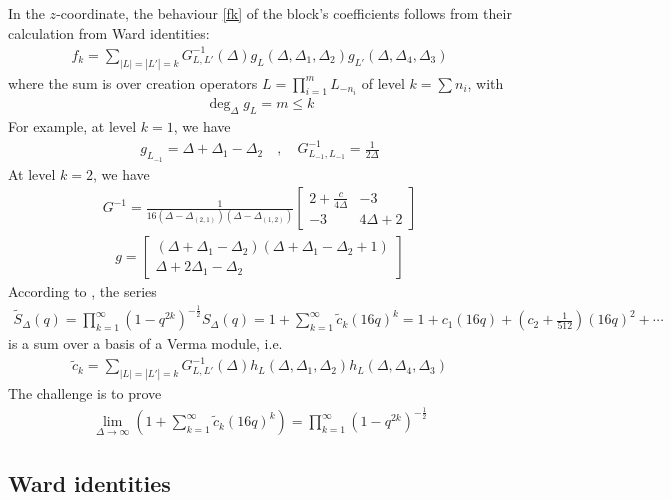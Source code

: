 \documentclass[12pt,a4paper]{article}
\begin{document}
In the $z$-coordinate, the behaviour \eqref{fk} of the block's coefficients follows from their calculation from Ward identities:
\begin{align}
 f_k = \sum_{|L|=|L'|=k} G^{-1}_{L,L'}(\Delta) g_L(\Delta,\Delta_1,\Delta_2)g_{L'}(\Delta,\Delta_4,\Delta_3)
\label{fke}
 \end{align}
where the sum is over creation operators $L=\prod_{i=1}^m L_{-n_i}$ of level $k=\sum n_i$, with 
\begin{align}
 \deg_\Delta g_L = m\leq k
\end{align}
For example, at level $k=1$, we have 
\begin{align}
 g_{L_{-1}} = \Delta + \Delta_1-\Delta_2 \quad , \quad G^{-1}_{L_{-1},L_{-1}} = \frac{1}{2\Delta} 
\end{align}
At level $k=2$, we have 
\begin{align}
G^{-1} = \frac{1}{16(\Delta-\Delta_{(2,1)})(\Delta-\Delta_{(1,2)})} \begin{bmatrix} 2+\frac{c}{4\Delta} & -3 \\ -3 & 4\Delta+2 \end{bmatrix}
\end{align}
\begin{align}
 g = \begin{bmatrix} (\Delta+\Delta_1-\Delta_2)(\Delta+\Delta_1-\Delta_2+1) \\ \Delta+2\Delta_1-\Delta_2 \end{bmatrix}
\end{align}
According to \cite[Eq. (7.11)]{msz15}, the series 
\begin{align}
 \widetilde{S}_\Delta(q) =  \prod_{k=1}^\infty\left(1-q^{2k}\right)^{-\frac12} S_\Delta(q)  = 1+\sum_{k=1}^\infty \tilde{c}_k (16q)^k = 1 + c_1 (16q) + \left(c_2+\tfrac{1}{512}\right) (16q)^2 + \cdots 
\end{align}
is a sum over a basis of a Verma module, i.e. 
\begin{align}
 \tilde{c}_k = \sum_{|L|=|L'|=k} G^{-1}_{L,L'}(\Delta) h_L(\Delta,\Delta_1,\Delta_2)h_L(\Delta,\Delta_4,\Delta_3)
 \label{ghh}
\end{align}
The challenge is to prove 
\begin{align}
 \lim_{\Delta\to \infty} \left(1+\sum_{k=1}^\infty \tilde{c}_k (16q)^k\right) = \prod_{k=1}^\infty\left(1-q^{2k}\right)^{-\frac12}
 \label{ltc}
\end{align}


\subsection{Ward identities}
\end{document}
